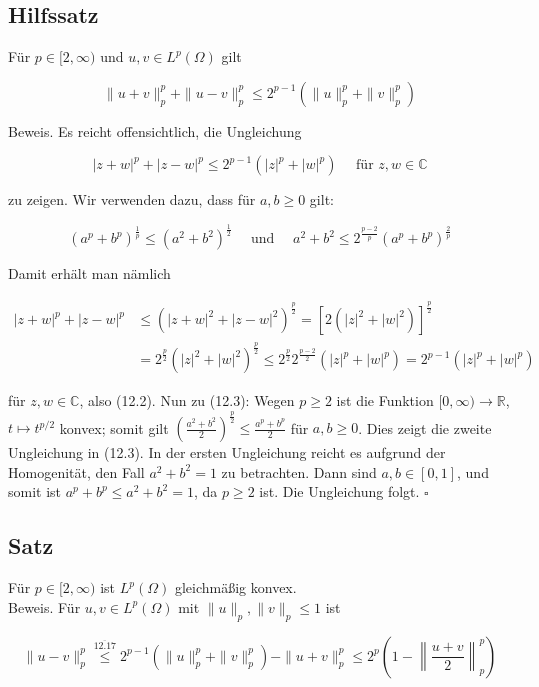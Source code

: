 \documentclass[10pt, letterpaper]{article}
\begin{document}
\subsection*{Hilfssatz}
Für $p \in[2, \infty)$ und $u, v \in L^{p}(\Omega)$ gilt

$$
\|u+v\|_{p}^{p}+\|u-v\|_{p}^{p} \leq 2^{p-1}\left(\|u\|_{p}^{p}+\|v\|_{p}^{p}\right)
$$

Beweis. Es reicht offensichtlich, die Ungleichung

$$
|z+w|^{p}+|z-w|^{p} \leq 2^{p-1}\left(|z|^{p}+|w|^{p}\right) \quad \text { für } z, w \in \mathbb{C}
$$

zu zeigen. Wir verwenden dazu, dass für $a, b \geq 0$ gilt:

$$
\left(a^{p}+b^{p}\right)^{\frac{1}{p}} \leq\left(a^{2}+b^{2}\right)^{\frac{1}{2}} \quad \text { und } \quad a^{2}+b^{2} \leq 2^{\frac{p-2}{p}}\left(a^{p}+b^{p}\right)^{\frac{2}{p}}
$$

Damit erhält man nämlich

$$
\begin{aligned}
|z+w|^{p}+|z-w|^{p} & \leq\left(|z+w|^{2}+|z-w|^{2}\right)^{\frac{p}{2}}=\left[2\left(|z|^{2}+|w|^{2}\right)\right]^{\frac{p}{2}} \\
& =2^{\frac{p}{2}}\left(|z|^{2}+|w|^{2}\right)^{\frac{p}{2}} \leq 2^{\frac{p}{2}} 2^{\frac{p-2}{2}}\left(|z|^{p}+|w|^{p}\right)=2^{p-1}\left(|z|^{p}+|w|^{p}\right)
\end{aligned}
$$

für $z, w \in \mathbb{C}$, also (12.2). Nun zu (12.3): Wegen $p \geq 2$ ist die Funktion $[0, \infty) \rightarrow \mathbb{R}$, $t \mapsto t^{p / 2}$ konvex; somit gilt $\left(\frac{a^{2}+b^{2}}{2}\right)^{\frac{p}{2}} \leq \frac{a^{p}+b^{p}}{2}$ für $a, b \geq 0$. Dies zeigt die zweite Ungleichung in (12.3). In der ersten Ungleichung reicht es aufgrund der Homogenität, den Fall $a^{2}+b^{2}=1$ zu betrachten. Dann sind $a, b \in[0,1]$, und somit ist $a^{p}+b^{p} \leq a^{2}+b^{2}=1$, da $p \geq 2$ ist. Die Ungleichung folgt. \(\square\)

\subsection*{Satz}
Für $p \in[2, \infty)$ ist $L^{p}(\Omega)$ gleichmäßig konvex.\\
Beweis. Für $u, v \in L^{p}(\Omega)$ mit $\|u\|_{p},\|v\|_{p} \leq 1$ ist

$$
\|u-v\|_{p}^{p} \stackrel{\overline{12.17}}{\leq} 2^{p-1}\left(\|u\|_{p}^{p}+\|v\|_{p}^{p}\right)-\|u+v\|_{p}^{p} \leq 2^{p}\left(1-\left\|\frac{u+v}{2}\right\|_{p}^{p}\right)
$$
\end{document}
